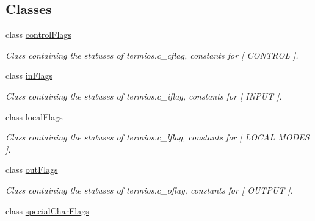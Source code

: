 \subsection*{Classes}
\begin{DoxyCompactItemize}
\item 
class \hyperlink{classport_1_1controlFlags}{control\+Flags}
\begin{DoxyCompactList}\small\item\em Class containing the statuses of termios.\+c\+\_\+cflag, constants for \mbox{[} C\+O\+N\+T\+R\+OL \mbox{]}. \end{DoxyCompactList}\item 
class \hyperlink{classport_1_1inFlags}{in\+Flags}
\begin{DoxyCompactList}\small\item\em Class containing the statuses of termios.\+c\+\_\+iflag, constants for \mbox{[} I\+N\+P\+UT \mbox{]}. \end{DoxyCompactList}\item 
class \hyperlink{classport_1_1localFlags}{local\+Flags}
\begin{DoxyCompactList}\small\item\em Class containing the statuses of termios.\+c\+\_\+lflag, constants for \mbox{[} L\+O\+C\+AL M\+O\+D\+ES \mbox{]}. \end{DoxyCompactList}\item 
class \hyperlink{classport_1_1outFlags}{out\+Flags}
\begin{DoxyCompactList}\small\item\em Class containing the statuses of termios.\+c\+\_\+oflag, constants for \mbox{[} O\+U\+T\+P\+UT \mbox{]}. \end{DoxyCompactList}\item 
class \hyperlink{classport_1_1specialCharFlags}{special\+Char\+Flags}
\end{DoxyCompactItemize}
